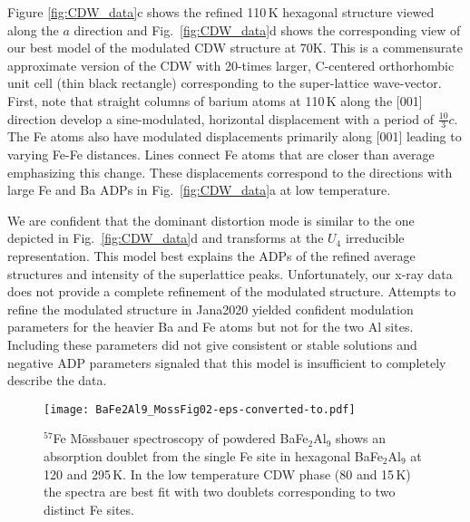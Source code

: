 \documentclass[journal=cmatex,manuscript=article]{achemso}
\begin{document}
\label{sec:Results_ModStructCartoon}
Figure \ref{fig:CDW_data}c shows the refined 110\,K hexagonal structure viewed along the $a$ direction and Fig.~\ref{fig:CDW_data}d shows the corresponding view of our best model of the modulated CDW structure at 70K. This is a commensurate approximate version of the CDW with 20-times larger, C-centered orthorhombic unit cell (thin black rectangle) corresponding to the super-lattice wave-vector. First, note that straight columns of barium atoms at 110\,K along the [001] direction develop a sine-modulated, horizontal displacement with a period of $\frac{10}{3} c$. The Fe atoms also have modulated displacements primarily along [001] leading to varying Fe-Fe distances. Lines connect Fe atoms that are closer than average emphasizing this change. These displacements correspond to the directions with large Fe and Ba ADPs in Fig.~\ref{fig:CDW_data}a at low temperature.

We are confident that the dominant distortion mode is similar to the one depicted in Fig.~\ref{fig:CDW_data}d and transforms at the $U_4$ irreducible representation.
This model best explains the ADPs of the refined average  structures and intensity of the superlattice peaks. Unfortunately, our x-ray data does not provide a complete refinement of the modulated structure. Attempts to refine the modulated structure in Jana2020 yielded confident modulation parameters for the heavier Ba and Fe atoms but not for the two Al sites. Including these parameters did not give consistent or stable solutions and negative ADP parameters signaled that this model is insufficient to completely describe the data.

\begin{figure}
	\texttt{[image: BaFe2Al9\_MossFig02-eps-converted-to.pdf]}
	\caption{\label{fig:Mossbauer} 
		$^{57}$Fe M\"ossbauer spectroscopy of powdered BaFe$_2$Al$_9$ shows an absorption doublet from the single Fe site in hexagonal BaFe$_2$Al$_9$ at 120 and 295\,K. In the low temperature CDW phase (80 and 15\,K) the spectra are best fit with two doublets corresponding to two distinct Fe sites.
	}
\end{figure}
\end{document}
